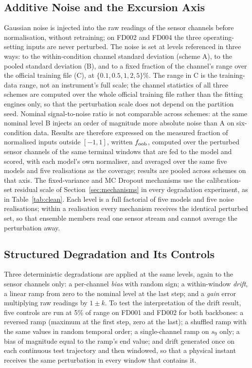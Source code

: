 \documentclass[journal]{IEEEtran}
\begin{document}
\subsection{Additive Noise and the Excursion Axis}
Gaussian noise is injected into the raw readings of the sensor channels before normalisation, without retraining; on FD002 and FD004 the three operating-setting inputs are never perturbed. The noise is set at levels referenced in three ways: to the within-condition channel standard deviation (scheme A), to the pooled standard deviation (B), and to a fixed fraction of the channel's range over the official training file (C), at $\{0.1,0.5,1,2,5\}\%$. The range in C is the training-data range, not an instrument's full scale; the channel statistics of all three schemes are computed over the whole official training file rather than the fitting engines only, so that the perturbation scale does not depend on the partition seed. Nominal signal-to-noise ratio is not comparable across schemes: at the same nominal level B injects an order of magnitude more absolute noise than A on six-condition data. Results are therefore expressed on the measured fraction of normalised inputs outside $[-1,1]$, written $f_{\mathrm{oob}}$, computed over the perturbed sensor channels of the same terminal windows that are fed to the model and scored, with each model's own normaliser, and averaged over the same five models and five realisations as the coverage; results are pooled across schemes on that axis. The fixed-variance and MC Dropout mechanisms use the calibration-set residual scale of Section~\ref{sec:mechanisms} in every degradation experiment, as in Table~\ref{tab:clean}. Each level is a full factorial of five models and five noise realisations; within a realisation every mechanism receives the identical perturbed set, so that ensemble members read one sensor stream and cannot average the perturbation away.

\subsection{Structured Degradation and Its Controls}
Three deterministic degradations are applied at the same levels, again to the sensor channels only: a per-channel \emph{bias} with random sign; a within-window \emph{drift}, a linear ramp from zero to the nominal level at the last step; and a \emph{gain} error multiplying raw readings by $1\pm k$. To test the interpretation of the drift result, five controls are run at 5\% of range on FD001 and FD002 for both backbones: a reversed ramp (maximum at the first step, zero at the last); a shuffled ramp with the same values in random temporal order; a single-channel ramp on $s_9$ only; a bias of magnitude equal to the ramp's end value; and drift generated once on each continuous test trajectory and then windowed, so that a physical instant receives the same perturbation in every window that contains it.
\end{document}
